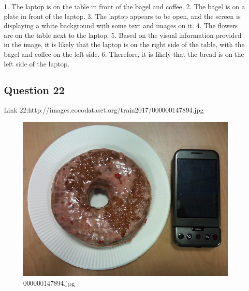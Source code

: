 \begin{enumerate}
        1. The laptop is on the table in front of the bagel and coffee.
        2. The bagel is on a plate in front of the laptop.
        3. The laptop appears to be open, and the screen is displaying a white background with some text and images on it.
        4. The flowers are on the table next to the laptop.
        5. Based on the visual information provided in the image, it is likely that the laptop is on the right side of the table, with the bagel and coffee on the left side.
        6. Therefore, it is likely that the bread is on the left side of the laptop.
    \end{enumerate}
\subsection*{Question 22}
Link 22:http://images.cocodataset.org/train2017/000000147894.jpg
    \begin{figure}[h]
        \centering
        \includegraphics[width=0.8\linewidth]{../image set/easy/000000147894.jpg}
        \caption{000000147894.jpg}
    \end{figure}
